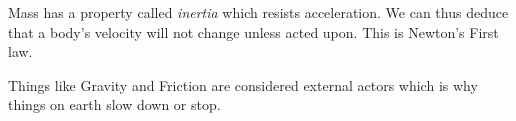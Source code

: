 \documentclass{report}
\begin{document}
\begin{description}
\begin{mdframed}
             Mass has a property called \textit{inertia} which
             resists acceleration. We can thus deduce that
             a body's velocity will not change unless acted
             upon. This is Newton's First law.

             Things like Gravity and Friction are considered
             external actors which is why things on earth slow
             down or stop.
        \end{mdframed}
    
\end{description}
\end{document}
